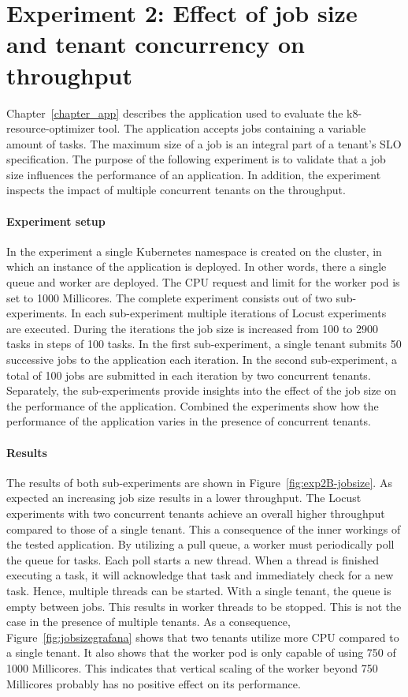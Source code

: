 \section{Experiment 2: Effect of job size and tenant concurrency on throughput}
Chapter~\ref{chapter_app} describes the application used to evaluate the k8-resource-optimizer tool. The application accepts jobs containing a variable amount of tasks. The maximum size of a job is an integral part of a tenant's SLO specification. The purpose of the following experiment is to validate that a job size influences the performance of an application. In addition, the experiment inspects the impact of multiple concurrent tenants on the throughput. 

\paragraph{Experiment setup}
In the experiment a single Kubernetes namespace is created on the cluster, in which  an instance of the  application is deployed. In other words, there a single queue and worker are deployed. The CPU request and limit for the worker pod is set to 1000 Millicores. The complete experiment consists out of two sub-experiments. In each sub-experiment multiple iterations of Locust experiments are executed. During the iterations the job size is increased from 100 to 2900 tasks in steps of 100 tasks. In the first sub-experiment, a single tenant submits 50 successive jobs to the application each iteration.  In the second sub-experiment, a total of 100 jobs are submitted in each iteration by two concurrent tenants. Separately, the sub-experiments provide insights into the effect of the job size on the performance of the application. Combined the experiments show how the performance of the application varies in the presence of concurrent tenants.  


\paragraph{Results}
The results of both sub-experiments are shown in Figure~\ref{fig:exp2B-jobsize}. As expected an increasing job size results in a lower throughput. The Locust experiments with two concurrent tenants achieve an overall higher throughput compared to those of a single tenant. This a consequence of the inner workings of the tested application. By utilizing a pull queue, a worker must periodically poll the queue for tasks. Each poll starts a new thread. When a thread is finished executing a task, it will acknowledge that task and immediately check for a new task. Hence, multiple threads can be started. With a single tenant, the queue is empty between jobs. This results in worker threads to be stopped. This is not the case in the presence of multiple tenants. As a consequence, Figure~\ref{fig:jobsizegrafana} shows that two tenants utilize more CPU compared to a single tenant. It also shows that the worker pod is only capable of using 750 of 1000 Millicores. This indicates that vertical scaling of the worker beyond 750 Millicores probably has no positive effect on its performance.

